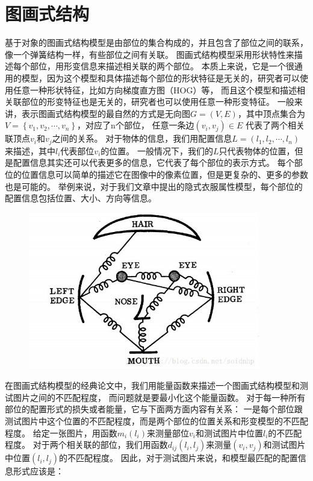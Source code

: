 \section{图画式结构}
基于对象的图画式结构模型是由部位的集合构成的，并且包含了部位之间的联系，像一个弹簧结构一样，有些部位之间有关联。
图画式结构模型采用形状特性来描述每个部位，用形变信息来描述相关联的两个部位。
本质上来说，它是一个很通用的模型，因为这个模型和具体描述每个部位的形状特征是无关的，研究者可以使用任意一种形状特征，比如方向梯度直方图（HOG）等，
而且这个模型和描述相关联部位的形变特征也是无关的，研究者也可以使用任意一种形变特征。
一般来讲，表示图画式结构模型的最自然的方式是无向图$G=(V, E)$，其中顶点集合为$V = \left\{v_1, v_2, \cdots, v_n \right\}$，对应了n个部位，
任意一条边$(v_i, v_j) \in E$ 代表了两个相关联顶点$v_i$和$v_j$之间的关系。
对于物体的信息，我们用配置信息$L = (l_1, l_2, \cdots, l_n)$ 来描述，其中$l_i$代表部位$v_i$的位置。
一般情况下，我们的$L$只代表物体的位置，但是配置信息其实还可以代表更多的信息，它代表了每个部位的表示方式。
每个部位的位置信息可以简单的描述它在图像中的像素位置，但是更复杂的、更多的参数也是可能的。
举例来说，对于我们文章中提出的隐式衣服属性模型，每个部位的配置信息包括位置、大小、方向等信息。

\begin{figure}
\centering
\includegraphics[width=0.9\textwidth]{img/ps.jpg}
\label{fig:ps}
\end{figure}

在图画式结构模型的经典论文\cite{ps1}中，我们用能量函数来描述一个图画式结构模型和测试图片之间的不匹配程度，
而问题就是要最小化这个能量函数。
对于每一种所有部位的配置形式的损失或者能量，它与下面两方面内容有关系：
一是每个部位跟测试图片中这个位置的不匹配程度，而是两个部位的位置关系和形变模型的不匹配程度。
给定一张图片，用函数$m_i(l_i)$来测量部位$v_i$和测试图片中位置$l_i$的不匹配程度。
对于两个相关联的部位，我们用函数$d_{ij}(l_i, l_j)$来测量$(v_i, v_j)$和测试图片中位置$(l_i, l_j)$的不匹配程度。
因此，对于测试图片来说，和模型最匹配的配置信息形式应该是：

